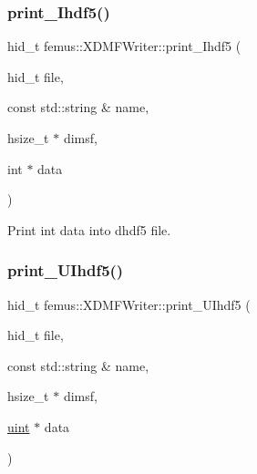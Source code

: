 \mbox{\label{classfemus_1_1_x_d_m_f_writer_ad3652ca6167ab1d3138e47c6c9092cea}} 
\subsubsection{\texorpdfstring{print\+\_\+\+Ihdf5()}{print\_Ihdf5()}}
{\footnotesize\ttfamily hid\+\_\+t femus\+::\+X\+D\+M\+F\+Writer\+::print\+\_\+\+Ihdf5 (\begin{DoxyParamCaption}\item[{hid\+\_\+t}]{file,  }\item[{const std\+::string \&}]{name,  }\item[{hsize\+\_\+t $\ast$}]{dimsf,  }\item[{int $\ast$}]{data }\end{DoxyParamCaption})\hspace{0.3cm}{\ttfamily [static]}}



Print int data into dhdf5 file. 

\mbox{\label{classfemus_1_1_x_d_m_f_writer_a80b2c0ddfe245928b273224fbb1a9f85}} 
\subsubsection{\texorpdfstring{print\+\_\+\+U\+Ihdf5()}{print\_UIhdf5()}}
{\footnotesize\ttfamily hid\+\_\+t femus\+::\+X\+D\+M\+F\+Writer\+::print\+\_\+\+U\+Ihdf5 (\begin{DoxyParamCaption}\item[{hid\+\_\+t}]{file,  }\item[{const std\+::string \&}]{name,  }\item[{hsize\+\_\+t $\ast$}]{dimsf,  }\item[{\mbox{\hyperlink{_typedefs_8hpp_a91ad9478d81a7aaf2593e8d9c3d06a14}{uint}} $\ast$}]{data }\end{DoxyParamCaption})\hspace{0.3cm}{\ttfamily [static]}}

